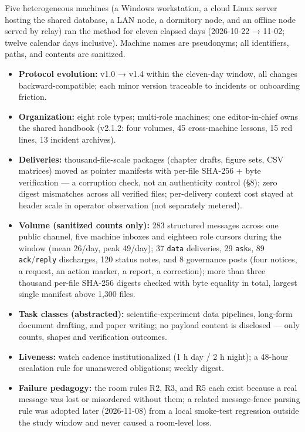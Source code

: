 \documentclass[journal]{IEEEtran}
\providecommand{\tightlist}{\setlength{\itemsep}{0pt}\setlength{\parskip}{0pt}}
\begin{document}
Five heterogeneous machines (a Windows workstation, a cloud Linux server
hosting the shared database, a LAN node, a dormitory node, and an
offline node served by relay) ran the method for eleven elapsed days
(2026-10-22 → 11-02; twelve calendar days inclusive). Machine names are
pseudonyms; all identifiers, paths, and contents are sanitized.

\begin{itemize}
\tightlist
\item
  \textbf{Protocol evolution:} v1.0 → v1.4 within the eleven-day window,
  all changes backward-compatible; each minor version traceable to
  incidents or onboarding friction.
\item
  \textbf{Organization:} eight role types; multi-role machines; one
  editor-in-chief owns the shared handbook (v2.1.2: four volumes, 45
  cross-machine lessons, 15 red lines, 13 incident archives).
\item
  \textbf{Deliveries:} thousand-file-scale packages (chapter drafts,
  figure sets, CSV matrices) moved as pointer manifests with per-file
  SHA-256 + byte verification --- a corruption check, not an
  authenticity control (§8); zero digest mismatches across all verified
  files; per-delivery context cost stayed at header scale in operator
  observation (not separately metered).
\item
  \textbf{Volume (sanitized counts only):} 283 structured messages
  across one public channel, five machine inboxes and eighteen role
  cursors during the window (mean 26/day, peak 49/day); 37 \texttt{data}
  deliveries, 29 \texttt{ask}s, 89 \texttt{ack}/\texttt{reply}
  discharges, 120 status notes, and 8 governance posts (four notices, a
  request, an action marker, a report, a correction); more than three
  thousand per-file SHA-256 digests checked with byte equality in total,
  largest single manifest above 1,300 files.
\item
  \textbf{Task classes (abstracted):} scientific-experiment data
  pipelines, long-form document drafting, and paper writing; no payload
  content is disclosed --- only counts, shapes and verification
  outcomes.
\item
  \textbf{Liveness:} watch cadence institutionalized (1 h day / 2 h
  night); a 48-hour escalation rule for unanswered obligations; weekly
  digest.
\item
  \textbf{Failure pedagogy:} the room rules R2, R3, and R5 each exist
  because a real message was lost or misordered without them; a related
  message-fence parsing rule was adopted later (2026-11-08) from a local
  smoke-test regression outside the study window and never caused a
  room-level loss.
\end{itemize}
\end{document}
